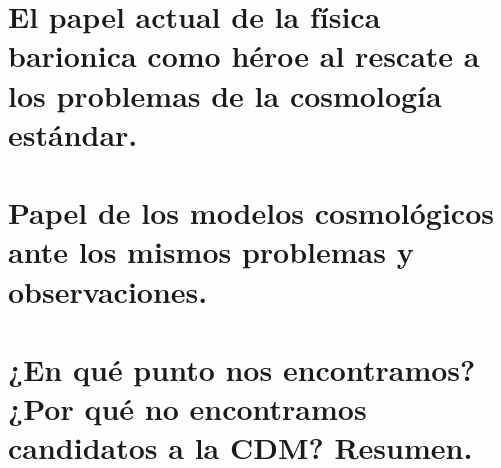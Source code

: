 \section{ El papel actual de la física barionica como héroe al rescate a los problemas de la cosmología estándar.}

\section{Papel de los modelos cosmológicos ante los mismos problemas y observaciones.}

\section{¿En qué punto nos encontramos? ¿Por qué no encontramos candidatos a la CDM? Resumen.}


